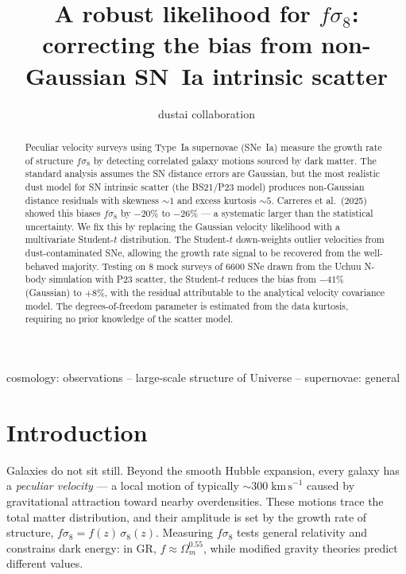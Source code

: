 \documentclass[fleqn,usenatbib]{mnras}
\title{A robust likelihood for $f\sigma_8$: correcting the bias from
non-Gaussian SN~Ia intrinsic scatter}
\author{dustai collaboration}
\date{}
\begin{document}
\maketitle

\begin{abstract}
Peculiar velocity surveys using Type~Ia supernovae (SNe~Ia) measure
the growth rate of structure $f\sigma_8$ by detecting correlated
galaxy motions sourced by dark matter. The standard analysis assumes
the SN distance errors are Gaussian, but the most realistic dust
model for SN intrinsic scatter (the BS21/P23 model) produces
non-Gaussian distance residuals with skewness $\sim 1$ and excess
kurtosis $\sim 5$. Carreres et al.\ (2025) showed this biases
$f\sigma_8$ by $-20\%$ to $-26\%$ --- a systematic larger than the
statistical uncertainty. We fix this by replacing the Gaussian
velocity likelihood with a multivariate Student-$t$ distribution.
The Student-$t$ down-weights outlier velocities from
dust-contaminated SNe, allowing the growth rate signal to be
recovered from the well-behaved majority. Testing on 8 mock surveys
of 6600 SNe drawn from the Uchuu N-body simulation with P23 scatter,
the Student-$t$ reduces the bias from $-41\%$ (Gaussian) to $+8\%$,
with the residual attributable to the analytical velocity covariance
model. The degrees-of-freedom parameter is estimated from the data
kurtosis, requiring no prior knowledge of the scatter model.
\end{abstract}

\begin{keywords}
cosmology: observations -- large-scale structure of Universe --
supernovae: general
\end{keywords}

\section{Introduction}
\label{sec:intro}

Galaxies do not sit still. Beyond the smooth Hubble expansion, every
galaxy has a \emph{peculiar velocity} --- a local motion of typically
$\sim 300\;\mathrm{km\,s}^{-1}$ caused by gravitational attraction
toward nearby overdensities. These motions trace the total matter
distribution, and their amplitude is set by the growth rate of
structure, $f\sigma_8 = f(z)\,\sigma_8(z)$. Measuring $f\sigma_8$
tests general relativity and constrains dark energy: in GR,
$f \approx \Omega_m^{0.55}$, while modified gravity theories predict
different values.
\end{document}
